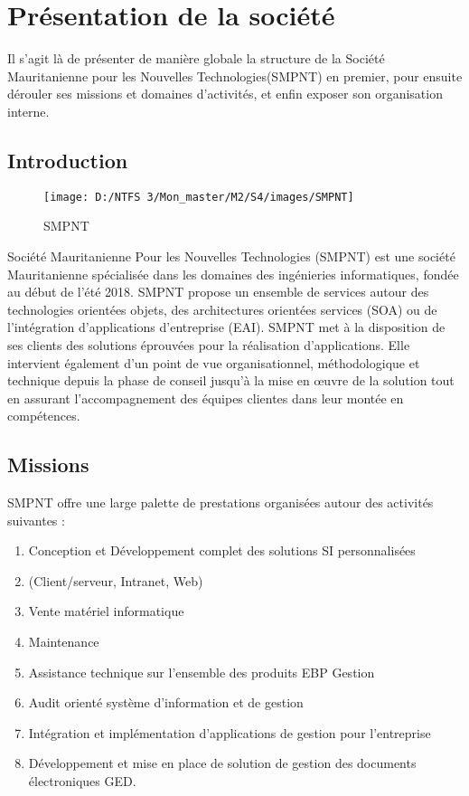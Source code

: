 \let\cleardoublepage\clearpage

\chapter{Présentation de la société}
\label{chap:introduction}


Il s’agit là de présenter de manière globale la structure de la Société Mauritanienne pour les Nouvelles Technologies(SMPNT) en premier, pour ensuite dérouler ses missions et domaines d’activités, et enfin exposer son organisation interne.

\section{Introduction}
\begin{figure}[h]
	\texttt{[image: D:/NTFS 3/Mon\_master/M2/S4/images/SMPNT]}
	\centering
	\caption{SMPNT}
\end{figure}
Société Mauritanienne Pour les Nouvelles Technologies (SMPNT) est une société Mauritanienne spécialisée dans les domaines des ingénieries informatiques, fondée au début de l'été 2018. SMPNT propose un ensemble de services autour des technologies orientées objets, des architectures orientées services (SOA) ou de l’intégration d’applications d’entreprise (EAI). SMPNT met à la disposition de ses clients des solutions éprouvées pour la réalisation d’applications. Elle intervient également d’un point de vue organisationnel, méthodologique et technique depuis la phase de conseil jusqu’à la mise en œuvre de la solution tout en assurant l’accompagnement des équipes clientes dans leur montée en compétences.
\section{Missions}
SMPNT offre une large palette de prestations organisées autour des activités suivantes :
\begin{enumerate}
	\item Conception et Développement complet des solutions SI personnalisées
	\item (Client/serveur, Intranet, Web)
	\item Vente matériel informatique
	\item Maintenance
	\item Assistance technique sur l'ensemble des produits EBP Gestion
	\item Audit orienté système d’information et de gestion
	\item Intégration et implémentation d'applications de gestion pour l'entreprise
	\item Développement et mise en place de solution de gestion des documents électroniques GED.
\end{enumerate}

